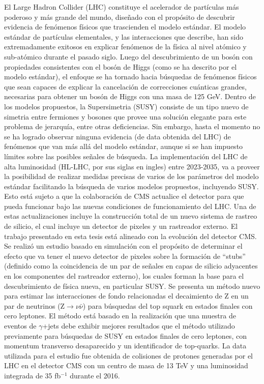 \documentclass[12pt,twoside,openany]{book}
\begin{document}
El Large Hadron Collider (LHC) constituye el acelerador de part\'iculas m\'as poderoso y m\'as grande del mundo, dise\~nado con el prop\'osito de descubrir evidencia de fen\'omenos f\'isicos que trascienden el modelo est\'andar. El modelo est\'andar de part\'iculas elementales, y las interacciones que describe, han sido extremadamente exitosos en explicar fen\'omenos de la f\'isica al nivel at\'omico y sub-at\'omico durante el pasado siglo. Luego del descubrimiento de un bos\'on con propiedades consistentes con el bos\'on de Higgs (como se ha descrito por el modelo est\'andar), el enfoque se ha tornado hacia b\'usquedas de fen\'omenos f\'isicos que sean capaces de explicar la cancelaci\'on de correcciones cu\'anticas grandes, necesarias para obtener un bos\'on de Higgs con una masa de 125 GeV. Dentro de los modelos propuestos, la Supersimetria (SUSY) consiste de un tipo nuevo de simetria entre fermiones y bosones que provee una soluci\'on elegante para este problema de jerarqu\'ia, entre otras deficiencias. Sin embargo, hasta el momento no se ha logrado observar ninguna evidencia (de data obtenida del LHC) de fen\'omenos que van m\'as all\'a del modelo est\'andar, aunque si se han impuesto l\'imites sobre las posibles se\~nales de b\'usqueda. La implementaci\'on del LHC de alta luminosidad (HL-LHC, por sus siglas en ingles) entre 2023-2035, va a proveer la posibilidad de realizar medidas precisas de varios de los par\'ametros del modelo est\'andar facilitando la b\'usqueda de varios modelos propuestos, incluyendo SUSY. Esto est\'a sujeto a que la colaboraci\'on de CMS actualice el detector para que pueda funcionar bajo las nuevas condiciones de funcionamiento del LHC. Una de estas actualizaciones incluye la construcci\'on total de un nuevo sistema de rastreo de silicio, el cual incluye un detector de pixeles y un rastreador externo. El trabajo presentado en esta tesis est\'a alineado con la evoluci\'on del detector CMS. Se realiz\'o un estudio basado en simulaci\'on con el prop\'osito de determinar el efecto que va tener el nuevo detector de pixeles sobre la formaci\'on de ``stubs'' (definido como la coincidencia de un par de se\~nales en capas de silicio adyacentes en los componentes del rastreador externo), los cuales forman la base para el descubrimiento de f\'isica nueva, en particular SUSY. Se presenta un m\'etodo nuevo para estimar las interacciones de fondo relacionadas el decaimiento de Z en un par de neutrinos (Z$\rightarrow \nu\bar{\nu}$) para b\'usquedas del top squark en estados finales con cero leptones. El m\'etodo est\'a basado en la realizaci\'on que una muestra de eventos de $\gamma$+jets debe exhibir mejores resultados que el m\'etodo utilizado previamente para b\'usquedas de SUSY en estados finales de cero leptones, con momentum transverso desaparecido y un identificador de top-quarks. La data utilizada para el estudio fue obtenida de colisiones de protones generadas por el LHC en el detector CMS con un centro de masa de 13 TeV y una luminosidad integrada de 35 fb$^{-1}$ durante el 2016.
\end{document}

